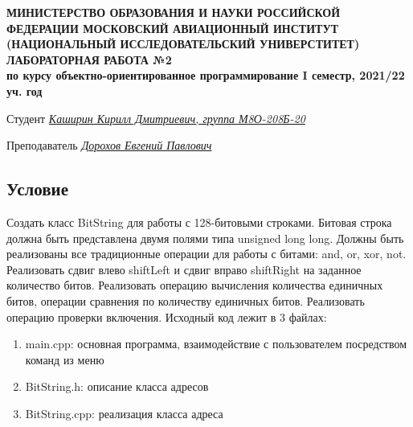 \documentclass[12pt]{article}
\begin{document}
\begin{titlepage}
\begin{center}
\textbf{МИНИСТЕРСТВО ОБРАЗОВАНИЯ И НАУКИ РОССИЙСКОЙ ФЕДЕРАЦИИ
\medskip
МОСКОВСКИЙ АВИАЦИОННЫЙ ИНСТИТУТ
(НАЦИОНАЛЬНЫЙ ИССЛЕДОВАТЕЛЬСКИЙ УНИВЕРСТИТЕТ)
\vfill\vfill
{\Huge ЛАБОРАТОРНАЯ РАБОТА №2} \\
по курсу объектно-ориентированное программирование
I семестр, 2021/22 уч. год}
\end{center}
\vfill

Студент \uline{\it {Каширин Кирилл Дмитриевич, группа М8О-208Б-20}\hfill}

Преподаватель \uline{\it {Дорохов Евгений Павлович}\hfill}

\vfill
\end{titlepage}

\subsection*{Условие}
Создать класс BitString для работы с 128-битовыми строками. Битовая строка
должна быть представлена двумя полями типа unsigned long long. Должны быть
реализованы все традиционные операции для работы с битами: and, or, xor, not.
Реализовать сдвиг влево shiftLeft и сдвиг вправо shiftRight на заданное количество битов. Реализовать операцию вычисления количества единичных битов, операции сравнения по количеству единичных битов. Реализовать операцию проверки
включения.
Исходный код лежит в 3 файлах:
\begin{enumerate}
\item main.cpp: основная программа, взаимодействие с пользователем посредством команд из меню
\item BitString.h:    описание класса адресов
\item BitString.cpp:  реализация класса адреса

\end{enumerate}
\pagebreak
\end{document}
